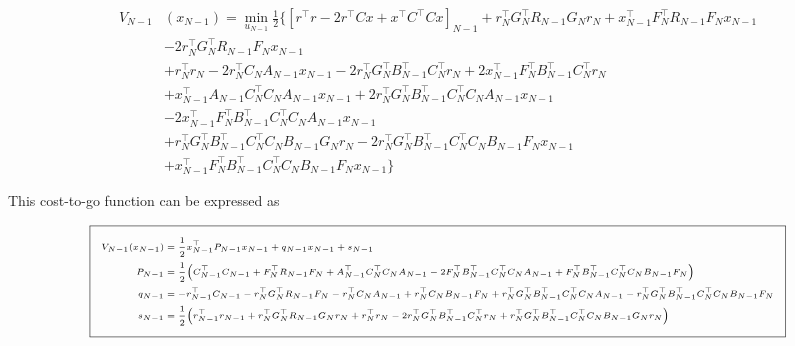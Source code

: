 \documentclass[11pt,letterpaper,onecolumn,notitlepage]{article}
\begin{document}
\begin{equation*}
  \begin{split}
    V_{N-1}&(x_{N-1})=\min_{u_{N-1}}\frac{1}{2}\biggr\{
    \left[r^{\top}r-2r^{\top}Cx+x^{\top}C^{\top}Cx\right]_{N-1}
    +r_{N}^{\top}G_{N}^{\top}R_{N-1}G_{N}r_{N}
    +x_{N-1}^{\top}F_{N}^{\top}R_{N-1}F_{N}x_{N-1} \\
    &-2r_{N}^{\top}G_{N}^{\top}R_{N-1}F_{N}x_{N-1} \\
    &+r_{N}^{\top}r_{N}
    -2r_{N}^{\top}C_{N}A_{N-1}x_{N-1}
    -2r_{N}^{\top}G_{N}^{\top}B_{N-1}^{\top}C_{N}^{\top}r_{N}
    +2x_{N-1}^{\top}F_{N}^{\top}B_{N-1}^{\top}C_{N}^{\top}r_{N} \\
    &+x_{N-1}^{\top}A_{N-1}C_{N}^{\top}C_{N}A_{N-1}x_{N-1}
    +2r_{N}^{\top}G_{N}^{\top}B_{N-1}^{\top}C_{N}^{\top}C_{N}A_{N-1}x_{N-1} \\
    &-2x_{N-1}^{\top}F_{N}^{\top}B_{N-1}^{\top}C_{N}^{\top}C_{N}A_{N-1}x_{N-1} \\
    &+r_{N}^{\top}G_{N}^{\top}B_{N-1}^{\top}C_{N}^{\top}C_{N}B_{N-1}G_{N}r_{N}
    -2r_{N}^{\top}G_{N}^{\top}B_{N-1}^{\top}C_{N}^{\top}C_{N}B_{N-1}F_{N}x_{N-1} \\
    &+x_{N-1}^{\top}F_{N}^{\top}B_{N-1}^{\top}C_{N}^{\top}C_{N}B_{N-1}F_{N}x_{N-1}
    \biggr\}
  \end{split}
\end{equation*}

This cost-to-go function can be expressed as

\begin{equation*}
  \fontsize{6pt}{1pt}\selectfont
  \addtolength{\fboxsep}{5pt}
  \boxed{%
    \begin{split}
      V_{N-1}(x_{N-1})&=\frac{1}{2}x_{N-1}^{\top}P_{N-1}x_{N-1}+q_{N-1}x_{N-1}+s_{N-1} \\
      P_{N-1}&=\frac{1}{2}\bigr(C_{N-1}^{\top}C_{N-1}+F_{N}^{\top}R_{N-1}F_{N}+A_{N-1}^{\top}C_{N}^{\top}C_{N}A_{N-1}-2F_{N}^{\top}B_{N-1}^{\top}C_{N}^{\top}C_{N}A_{N-1}+F_{N}^{\top}B_{N-1}^{\top}C_{N}^{\top}C_{N}B_{N-1}F_{N}\bigr) \\
      q_{N-1}&=-r_{N-1}^{\top}C_{N-1}-r_{N}^{\top}G_{N}^{\top}R_{N-1}F_{N}-r_{N}^{\top}C_{N}A_{N-1}+r_{N}^{\top}C_{N}B_{N-1}F_{N}+r_{N}^{\top}G_{N}^{\top}B_{N-1}^{\top}C_{N}^{\top}C_{N}A_{N-1}-r_{N}^{\top}G_{N}^{\top}B_{N-1}^{\top}C_{N}^{\top}C_{N}B_{N-1}F_{N} \\
      s_{N-1}&=\frac{1}{2}\bigr(r_{N-1}^{\top}r_{N-1}+r_{N}^{\top}G_{N}^{\top}R_{N-1}G_{N}r_{N}+r_{N}^{\top}r_{N}-2r_{N}^{\top}G_{N}^{\top}B_{N-1}^{\top}C_{N}^{\top}r_{N}+r_{N}^{\top}G_{N}^{\top}B_{N-1}^{\top}C_{N}^{\top}C_{N}B_{N-1}G_{N}r_{N}\bigr)
    \end{split}
  }
\end{equation*}
\end{document}
